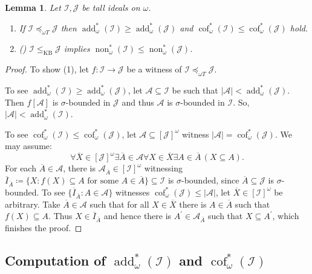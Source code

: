 \documentclass[a4paper,12pt]{amsart}
\newtheorem{lem}[thm]{Lemma}
\theoremstyle{definition}
\numberwithin{thm}{section}
\numberwithin{equation}{section}
\DeclareMathOperator{\non}{non}
\DeclareMathOperator{\add}{add}
\DeclareMathOperator{\cof}{cof}
\newcommand{\I}{\mathscr{I}}
\newcommand{\J}{\mathscr{J}}
\renewcommand{\subset}{\subseteq}
\begin{document}
    \begin{lem}\label{lem:reductions_and_invstaromega}
        Let $\I, \J$ be tall ideals on $\omega$.
        \begin{enumerate}
            \item If $\I \preceq_{\omega T} \J$ then $\add^*_\omega(\I)\geq\add^*_\omega(\J)$ and $\cof^*_\omega(\I)\leq\cof^*_\omega(\J)$ hold.
            \item \textnormal{(\cite[Proposition 4.6]{CM25})} $\I \leq_{\mathrm{KB}} \J$ implies $\non^*_\omega(\I) \leq \non^*_\omega(\J)$. 
        \end{enumerate}
    \end{lem}
    \begin{proof}
        To show (1), let $f\colon\I\to\J$ be a witness of $\I \preceq_{\omega T} \J$. 
        
        To see $\add^*_\omega(\I)\geq\add^*_\omega(\J)$, let $\mathcal{A}\subset\I$ be such that $\lvert\mathcal{A}\rvert < \add^*_\omega(\J)$. Then $f[\mathcal{A}]$ is $\sigma$-bounded in $\J$ and thus $\mathcal{A}$ is $\sigma$-bounded in $\I$. So, $\lvert\mathcal{A}\rvert < \add^*_\omega(\I)$.
    
        To see $\cof^*_\omega(\I)\leq\cof^*_\omega(\J)$, let $\mathcal{A}\subseteq[\J]^\omega$ witness $|\mathcal{A}|=\cof^*_\omega(\J)$. 
        We may assume:
        \[\forall\overline{X}\in[\J]^\omega\exists\overline{A}\in\mathcal{A}\forall X\in\overline{X}\exists A\in\overline{A}\, (X \subset A).\]
        For each $\overline{A}\in\mathcal{A}$, there is $\mathcal{A}_{\overline{A}}\in[\I]^\omega$ witnessing $\overline{I}_{\overline{A}}\coloneqq\{X:f(X)\subseteq A\text{ for some }A\in\overline{A}\}\subseteq\I$ is $\sigma$-bounded, since $\overline{A}\subseteq\J$ is $\sigma$-bounded. To see $\{\overline{I}_{\overline{A}}:A\in\mathcal{A}\}$ witnesses $\cof^*_\omega(\J)\leq|\mathcal{A}|$, let $\overline{X}\in[\I]^\omega$ be arbitrary. Take $\overline{A}\in\mathcal{A}$ such that for all $X\in\overline{X}$ there is $A\in\overline{A}$ such that $f(X) \subseteq A$. Thus $X\in\overline{I}_{\overline{A}}$ and hence there is $A^\prime\in\mathcal{A}_{\overline{A}}$ such that $X\subseteq A^\prime$, which finishes the proof.
    \end{proof}
    
    
    \subsection{Computation of $\add^*_\omega(\I)$ and $\cof^*_\omega(\I)$}
    
\end{document}
